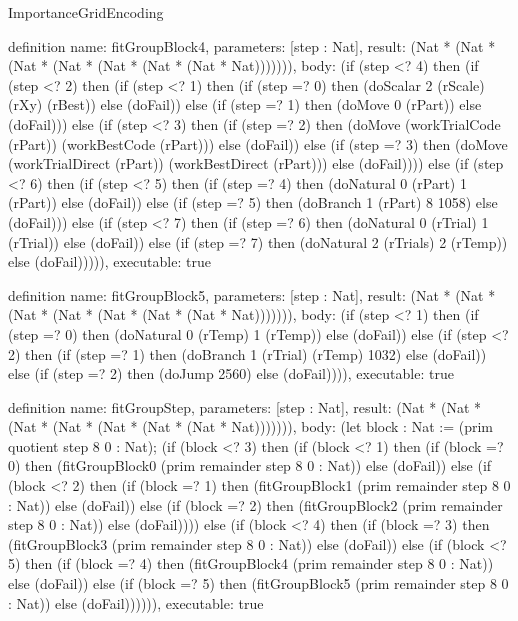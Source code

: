 \begin{lexlean}{ImportanceGridEncoding}
\begin{semanticmodule}
definition{
  name: fitGroupBlock4,
  parameters: [step : Nat],
  result: (Nat * (Nat * (Nat * (Nat * (Nat * (Nat * (Nat * Nat))))))),
  body: (if (step <? 4) then
      (if (step <? 2) then
      (if (step <? 1) then
      (if (step =? 0) then (doScalar 2 (rScale) (rXy) (rBest)) else (doFail)) else
      (if (step =? 1) then (doMove 0 (rPart)) else (doFail))) else
      (if (step <? 3) then
      (if (step =? 2) then (doMove (workTrialCode (rPart)) (workBestCode (rPart))) else (doFail)) else
      (if (step =? 3) then (doMove (workTrialDirect (rPart)) (workBestDirect (rPart))) else (doFail)))) else
      (if (step <? 6) then
      (if (step <? 5) then
      (if (step =? 4) then (doNatural 0 (rPart) 1 (rPart)) else (doFail)) else
      (if (step =? 5) then (doBranch 1 (rPart) 8 1058) else (doFail))) else
      (if (step <? 7) then
      (if (step =? 6) then (doNatural 0 (rTrial) 1 (rTrial)) else (doFail)) else
      (if (step =? 7) then (doNatural 2 (rTrials) 2 (rTemp)) else (doFail))))),
  executable: true
}

definition{
  name: fitGroupBlock5,
  parameters: [step : Nat],
  result: (Nat * (Nat * (Nat * (Nat * (Nat * (Nat * (Nat * Nat))))))),
  body: (if (step <? 1) then
      (if (step =? 0) then (doNatural 0 (rTemp) 1 (rTemp)) else (doFail)) else
      (if (step <? 2) then
      (if (step =? 1) then (doBranch 1 (rTrial) (rTemp) 1032) else (doFail)) else
      (if (step =? 2) then (doJump 2560) else (doFail)))),
  executable: true
}

definition{
  name: fitGroupStep,
  parameters: [step : Nat],
  result: (Nat * (Nat * (Nat * (Nat * (Nat * (Nat * (Nat * Nat))))))),
  body: (let block : Nat := (prim quotient step 8 0 : Nat); (if (block <? 3) then
      (if (block <? 1) then
      (if (block =? 0) then (fitGroupBlock0 (prim remainder step 8 0 : Nat)) else (doFail)) else
      (if (block <? 2) then
      (if (block =? 1) then (fitGroupBlock1 (prim remainder step 8 0 : Nat)) else (doFail)) else
      (if (block =? 2) then (fitGroupBlock2 (prim remainder step 8 0 : Nat)) else (doFail)))) else
      (if (block <? 4) then
      (if (block =? 3) then (fitGroupBlock3 (prim remainder step 8 0 : Nat)) else (doFail)) else
      (if (block <? 5) then
      (if (block =? 4) then (fitGroupBlock4 (prim remainder step 8 0 : Nat)) else (doFail)) else
      (if (block =? 5) then (fitGroupBlock5 (prim remainder step 8 0 : Nat)) else (doFail)))))),
  executable: true
}


\end{semanticmodule}
\end{lexlean}
